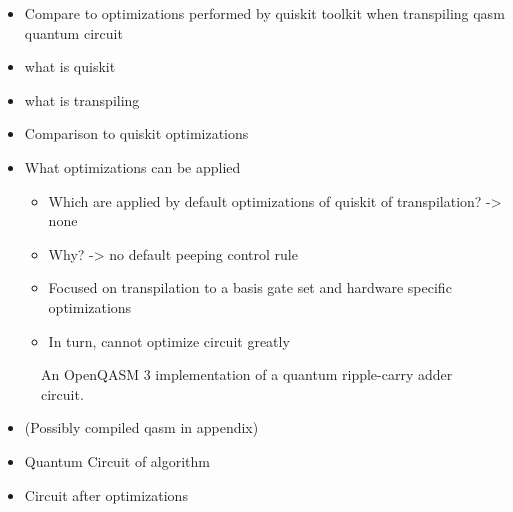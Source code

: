 \begin{itemize}
    \item Compare to optimizations performed by quiskit toolkit when transpiling qasm quantum circuit
    \item what is quiskit
    \item what is transpiling
    \item Comparison to quiskit optimizations
    \item What optimizations can be applied
    \begin{itemize}
        \item Which are applied by default optimizations of quiskit of transpilation? -> none
        \item Why? -> no default peeping control rule
        \item Focused on transpilation to a basis gate set and hardware specific optimizations 
        \item In turn, cannot optimize circuit greatly
    \end{itemize}
\end{itemize}


\begin{figure}[htp]
    \centering     
    
    \caption{An OpenQASM 3 implementation of a quantum ripple-carry adder circuit.}
    \label{fig:eval_adder_qasm}
\end{figure}



\begin{itemize}
    \item (Possibly compiled qasm in appendix)
    \item Quantum Circuit of algorithm  
\end{itemize}


\begin{itemize}
    \item Circuit after optimizations
\end{itemize}